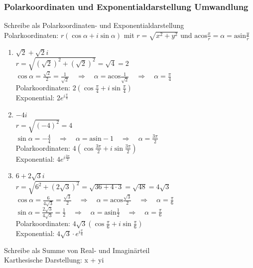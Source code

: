 \documentclass[11pt, a4paper]{article}
\newcommand{\acos}{\mathrm{acos}}
\newcommand{\asin}{\mathrm{asin}}
\begin{document}
\subsubsection{Polarkoordinaten und Exponentialdarstellung Umwandlung}
Schreibe als Polarkoordinaten- und Exponentialdarstellung \\
Polarkoordinaten: $r(\cos \alpha + i \sin \alpha)$ mit $r=\sqrt{x^2+y^2}$ und $\acos \frac{x}{r} = \alpha = \asin \frac{y}{r}$
\begin{enumerate}
	\item $\sqrt{2}+\sqrt{2}i$ \\
	$r = \sqrt{(\sqrt{2})^2 + (\sqrt{2})^2} = \sqrt{4} = 2$ \\
	$\cos \alpha = \frac{\sqrt{2}}{2} = \frac{1}{\sqrt{2}} \quad \Rightarrow \quad \alpha = \acos \frac{1}{\sqrt{2}} \quad \Rightarrow \quad \alpha = \frac{\pi}{4}$ \\
	Polarkoordinaten: $2 \left( \cos \frac{\pi}{4} + i \sin \frac{\pi}{4} \right)$ \\
	Exponential: $2 e^{i \frac{\pi}{4}}$
	\item $-4i$ \\
	$r = \sqrt{(-4)^2} = 4$ \\
	$\sin \alpha = -\frac{4}{4} \quad \Rightarrow \quad \alpha = \asin -1 \quad \Rightarrow \quad \alpha = \frac{3\pi}{2}$ \\
	Polarkoordinaten: $4 \left( \cos \frac{3\pi}{2} + i \sin \frac{3\pi}{2} \right)$ \\
	Exponential: $4 e^{i \frac{3\pi}{2}}$
	\item $6+2\sqrt{3}i$ \\
	$r = \sqrt{6^2 + (2\sqrt{3})^2} = \sqrt{36 + 4 \cdot 3} = \sqrt{48} = 4 \sqrt{3}$ \\
	$\cos \alpha = \frac{6}{4\sqrt{3}} = \frac{\sqrt{3}}{2} \quad \Rightarrow \quad \alpha = \acos \frac{\sqrt{3}}{2} \quad \Rightarrow \quad \alpha = \frac{\pi}{6}$ \\
	$\sin \alpha = \frac{2\sqrt{3}}{4\sqrt{3}} = \frac{1}{2} \quad \Rightarrow \quad \alpha = \asin \frac{1}{2} \quad \Rightarrow \quad \alpha = \frac{\pi}{6}$ \\
	Polarkoordinaten: $4\sqrt{3} \left( \cos \frac{\pi}{6} + i \sin \frac{\pi}{6} \right)$ \\
	Exponential: $4\sqrt{3} \cdot e^{i \frac{\pi}{6}}$
\end{enumerate}
Schreibe als Summe von Real- und Imaginärteil \\
Karthesische Darstellung: x + yi
\end{document}
